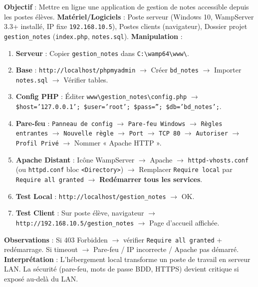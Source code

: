 \documentclass[11pt]{article}
\begin{document}
\begin{experience}
\textbf{Objectif} : Mettre en ligne une application de gestion de notes accessible depuis les postes élèves.
\textbf{Matériel/Logiciels} : Poste serveur (Windows 10, WampServer 3.3+ installé, IP fixe \texttt{192.168.10.5}), Postes clients (navigateur), Dossier projet \texttt{gestion\_notes} (\texttt{index.php}, \texttt{notes.sql}).
\textbf{Manipulation} :
\begin{enumerate}
\item \textbf{Serveur} : Copier \texttt{gestion\_notes} dans \texttt{C:\textbackslash wamp64\textbackslash www\textbackslash}.
\item \textbf{Base} : \texttt{http://localhost/phpmyadmin} $\rightarrow$ Créer \texttt{bd\_notes} $\rightarrow$ Importer \texttt{notes.sql} $\rightarrow$ Vérifier tables.
\item \textbf{Config PHP} : Éditer \texttt{www\textbackslash gestion\_notes\textbackslash config.php} $\rightarrow$ \texttt{\$host='127.0.0.1'; \$user='root'; \$pass=''; \$db='bd\_notes';}.
\item \textbf{Pare-feu} : \texttt{Panneau de config} $\rightarrow$ \texttt{Pare-feu Windows} $\rightarrow$ \texttt{Règles entrantes} $\rightarrow$ \texttt{Nouvelle règle} $\rightarrow$ \texttt{Port} $\rightarrow$ \texttt{TCP 80} $\rightarrow$ \texttt{Autoriser} $\rightarrow$ \texttt{Profil Privé} $\rightarrow$ Nommer « Apache HTTP ».
\item \textbf{Apache Distant} : Icône WampServer $\rightarrow$ Apache $\rightarrow$ \texttt{httpd-vhosts.conf} (ou \texttt{httpd.conf} bloc \texttt{<Directory>}) $\rightarrow$ Remplacer \texttt{Require local} par \texttt{Require all granted} $\rightarrow$ \textbf{Redémarrer tous les services}.
\item \textbf{Test Local} : \texttt{http://localhost/gestion\_notes} $\rightarrow$ OK.
\item \textbf{Test Client} : Sur poste élève, navigateur $\rightarrow$ \texttt{http://192.168.10.5/gestion\_notes} $\rightarrow$ Page d'accueil affichée.
\end{enumerate}
\textbf{Observations} : Si 403 Forbidden $\rightarrow$ vérifier \texttt{Require all granted} + redémarrage. Si timeout $\rightarrow$ Pare-feu / IP incorrecte / Apache pas démarré.
\textbf{Interprétation} : L'hébergement local transforme un poste de travail en serveur LAN. La sécurité (pare-feu, mots de passe BDD, HTTPS) devient critique si exposé au-delà du LAN.
\end{experience}
\end{document}
